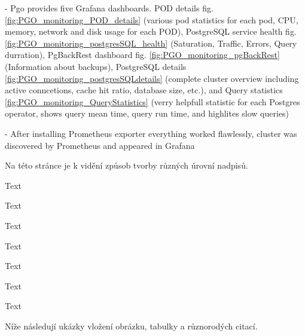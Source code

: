 - Pgo provides five Grafana dashboards. POD details fig. \ref{fig:PGO_monitoring_POD_details} (various pod statistics for each pod, CPU, memory, network and disk usage for each POD),
PostgreSQL service health fig. \ref{fig:PGO_monitoring_postgresSQL_health} (Saturation, Traffic, Errors, Query durration),
PgBackRest dashboard fig. \ref{fig:PGO_monitoring_pgBackRest} (Information about backups),
PostgreSQL details \ref{fig:PGO_monitoring_postgresSQLdetails} (complete cluster overview including active conncetions, cache hit ratio, database size, etc.),
and Query statistics \ref{fig:PGO_monitoring_QueryStatistics} (verry helpfull statistic for each Postgres operator, shows query mean time, query run time, and highlites slow queries)

- After installing Prometheus exporter everything worked flawlessly, cluster was discovered by Prometheus and appeared in Grafana












Na této stránce je k vidění způsob tvorby různých úrovní nadpisů.

Text

Text

Text

Text

Text

Text

Text


Níže následují ukázky vložení obrázku, tabulky a různorodých citací.


